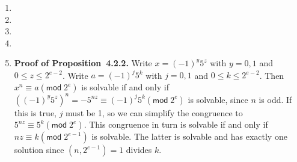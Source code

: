 \documentclass[12pt]{article}
\renewcommand{\pmod}[1]{\left(\mathsf{mod}\;#1\right)}
\begin{document}
\begin{enumerate}
\item %
\item %
\item %
\item %

\item %
{\bf Proof of Proposition~4.2.2.}
Write $x=\left(-1\right)^y5^z$ with $y=0,1$ and $0\le z\le 2^{e-2}$.
Write $a=\left(-1\right)^j5^k$ with $j=0,1$ and $0\le k\le 2^{e-2}$.
Then $x^n\equiv a\pmod{2^e}$ is solvable if and only if
$\left(\left(-1\right)^y5^z\right)^n=-5^{nz}
\equiv\left(-1\right)^j5^k\pmod{2^e}$ is solvable, since $n$ is odd.
If this is true, $j$ must be 1, so we can simplify the congruence
to $5^{nz}\equiv 5^k\pmod{2^e}$. This congruence in turn is solvable
if and only if $nz\equiv k\pmod{2^{e-1}}$ is solvable. The latter
is solvable and has exactly one solution
since $\left(n,2^{e-1}\right)=1$ divides $k$.

\end{enumerate}
\end{document}
